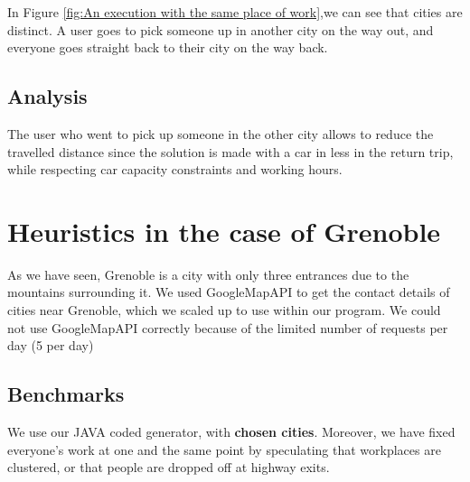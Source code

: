 \documentclass[12pt, a4paper, twoside]{memoir}
\begin{document}
{	In Figure \ref{fig:An execution with the same place of work},we can see that cities are distinct. A user goes to pick someone up in another city on the way out, and everyone goes straight back to their city on the way back.
	
	\subsection{Analysis}
	The user who went to pick up someone in the other city allows to reduce the travelled distance since the solution is made with a car in less in the return trip, while respecting car capacity constraints and working hours.
	
	\section{Heuristics in the case of Grenoble}
	
	As we have seen, Grenoble is a city with only three entrances due to the mountains surrounding it. We used GoogleMapAPI to get the contact details of cities near Grenoble, which we scaled up to use within our program. We could not use GoogleMapAPI correctly because of the limited number of requests per day (5 per day)
	
	\subsection{Benchmarks}
	We use our JAVA coded generator, with \textbf{chosen cities}. Moreover, we have fixed everyone's work at one and the same point by speculating that workplaces are clustered, or that people are dropped off at highway exits.
	
}
\end{document}

